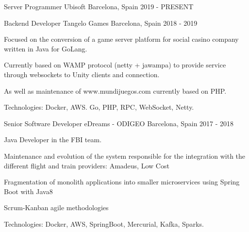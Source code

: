 

\begin{cventries}

  \cventry
    {Server Programmer} %
    {Ubisoft} %
    {Barcelona, Spain} %
    {2019 - PRESENT} %
    {
    }

  \cventry
    {Backend Developer} %
    {Tangelo Games} %
    {Barcelona, Spain} %
    {2018 - 2019} %
    {
      \begin{cvitems} %
        \item {Focused on the conversion of a game server platform for social casino company written in Java for GoLang.}
        \item {Currently based on WAMP protocol (netty + jawampa) to provide service through websockets to Unity clients and connection.}
        \item {As well as maintenance of www.mundijuegos.com currently based on PHP.}
        \item {Technologies: Docker, AWS. Go, PHP, RPC, WebSocket, Netty.}
      \end{cvitems}
    }

  \cventry
    {Senior Software Developer} %
    {eDreams - ODIGEO} %
    {Barcelona, Spain} %
    {2017 - 2018} %
    {
      \begin{cvitems} %
        \item {Java Developer in the FBI team.}
        \item {Maintenance and evolution of the system responsible for the integration with the different flight and train providers: Amadeus, Low Cost}
        \item {Fragmentation of monolith applications into smaller microservices using Spring Boot with Java8}
        \item {Scrum-Kanban agile methodologies}
        \item {Technologies: Docker, AWS, SpringBoot, Mercurial, Kafka, Sparks.}
      \end{cvitems}
    }


\end{cventries}
